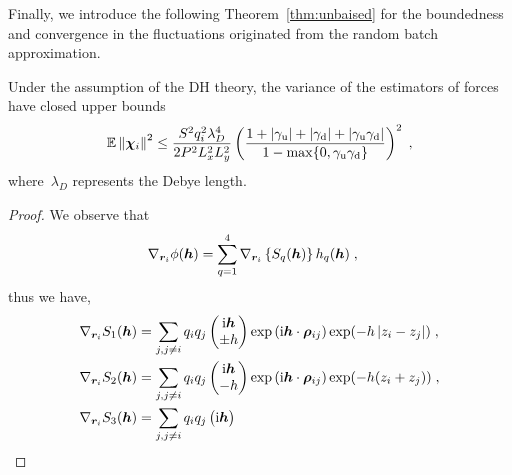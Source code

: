 Finally, we introduce the following Theorem~\ref{thm:unbaised} for the boundedness and convergence in the fluctuations originated from the random batch approximation.
\begin{thm}\label{thm:unbaised}
	Under the assumption of the DH theory, the variance of the estimators of forces have closed upper bounds
	\begin{equation}
		  \mathbb{E}\left\lVert\boldsymbol{\chi}_{i}\right\rVert^2\leq\frac{ S^2q_i^2\lambda_{D}^4}{2P ^2 L_x^2L_y^2}\left( \frac{1+\left\lvert\gamma_{\mathrm{u}}\right\rvert+\left\lvert\gamma_{\mathrm{d}}\right\rvert+\left\lvert\gamma_{\mathrm{u}}\gamma_{\mathrm{d}}\right\rvert}{1-\max\{0,\gamma_{\mathrm{u}}\gamma_{\mathrm{d}}\}}\right)^2\;,
	\end{equation}
     where~$\lambda_{D}$  represents the Debye length.
\end{thm}
\begin{proof}
We observe that 
\begin{align*}
 \nabla_{\bm{r}_i}\phi(\boldsymbol{h})&=   \sum_{q=1}^4 \nabla_{\bm{r}_i}\left\{S_q(\boldsymbol{h})\right\}h_q(\boldsymbol{h})\;,
\end{align*}
thus we have,
%
%
\begin{align*}
 \nabla_{\bm{r}_i} S_1(\boldsymbol{h})&=\sum_{j,j\neq i}q_iq_j   \begin{pmatrix} \mathrm{i} \boldsymbol{h} \\
 \pm h  \end{pmatrix}\exp{(\mathrm{i} \boldsymbol{h} \cdot \boldsymbol{\rho}_{ij})}\exp(-h\left\lvert z_i-z_j\right\rvert)\;,\\
 \nabla_{\bm{r}_i} S_2(\boldsymbol{h})&=\sum_{j,j\neq i}q_iq_j   \begin{pmatrix} \mathrm{i} \boldsymbol{h} \\
 -h  \end{pmatrix}\exp{(\mathrm{i} \boldsymbol{h} \cdot \boldsymbol{\rho}_{ij})}\exp(-h(z_i+z_j))\;,\\
  \nabla_{\bm{r}_i} S_3(\boldsymbol{h})&=\sum_{j,j\neq i}q_iq_j   \begin{pmatrix} \mathrm{i} \boldsymbol{h} \\

\end{pmatrix}
\end{align*}
\end{proof}
